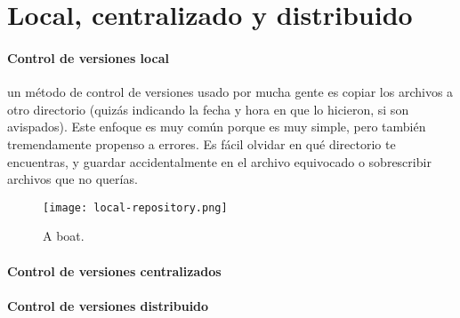 \documentclass[12pt]{article}
\begin{document}
	\section{Local, centralizado y distribuido}
	{
		\paragraph{Control de versiones local}{
			un método de control de versiones usado por mucha gente es copiar los archivos a otro directorio (quizás indicando la fecha y hora en que lo hicieron, si son avispados). Este enfoque es muy común porque es muy simple, pero también tremendamente propenso a errores. Es fácil olvidar en qué directorio te encuentras, y guardar accidentalmente en el archivo equivocado o sobrescribir archivos que no querías.
			
			\begin{figure}
				\texttt{[image: local-repository.png]}	
				\caption{A boat.}
				\label{fig:boat1}
			\end{figure}
		}
		\paragraph{Control de versiones centralizados}{
		}
		\paragraph{Control de versiones distribuido}{
		}
	}
\end{document}

